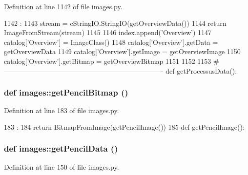 Definition at line 1142 of file images.py.


\begin{DoxyCode}
1142                       :
1143     stream = cStringIO.StringIO(getOverviewData())
1144     return ImageFromStream(stream)
1145 
1146 index.append('Overview')
1147 catalog['Overview'] = ImageClass()
1148 catalog['Overview'].getData = getOverviewData
1149 catalog['Overview'].getImage = getOverviewImage
1150 catalog['Overview'].getBitmap = getOverviewBitmap
1151 
1152 
1153 #----------------------------------------------------------------------
def getProcessusData():
\end{DoxyCode}
\hypertarget{namespaceimages_ade99459cbe2011a90a79b61b844050a7}{
\subsubsection[{getPencilBitmap}]{\setlength{\rightskip}{0pt plus 5cm}def images::getPencilBitmap ()}}
\label{namespaceimages_ade99459cbe2011a90a79b61b844050a7}


Definition at line 183 of file images.py.


\begin{DoxyCode}
183                      :
184     return BitmapFromImage(getPencilImage())
185 
def getPencilImage():
\end{DoxyCode}
\hypertarget{namespaceimages_a7fae7d68a8725a221f2e706df0158ec9}{
\subsubsection[{getPencilData}]{\setlength{\rightskip}{0pt plus 5cm}def images::getPencilData ()}}
\label{namespaceimages_a7fae7d68a8725a221f2e706df0158ec9}


Definition at line 150 of file images.py.


